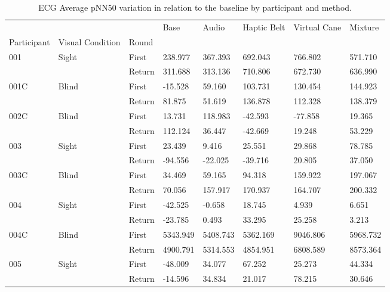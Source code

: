 
\begin{table}[!htb]
\centering
\caption{ECG Average pNN50 variation in relation to the baseline by participant and method.}
\label{tab:ecg_pnn50_variation}
\begin{tabular}{llllllll}
\toprule
    &       &        &     Base &    Audio & Haptic Belt & Virtual Cane &  Mixture \\
Participant & Visual Condition & Round &          &          &             &              &          \\
\midrule
001 & Sight & First &  238.977 &  367.393 &     692.043 &      766.802 &  571.710 \\
    &       & Return &  311.688 &  313.136 &     710.806 &      672.730 &  636.990 \\
001C & Blind & First &  -15.528 &   59.160 &     103.731 &      130.454 &  144.923 \\
    &       & Return &   81.875 &   51.619 &     136.878 &      112.328 &  138.379 \\
002C & Blind & First &   13.731 &  118.983 &     -42.593 &      -77.858 &   19.365 \\
    &       & Return &  112.124 &   36.447 &     -42.669 &       19.248 &   53.229 \\
003 & Sight & First &   23.439 &    9.416 &      25.551 &       29.868 &   78.785 \\
    &       & Return &  -94.556 &  -22.025 &     -39.716 &       20.805 &   37.050 \\
003C & Blind & First &   34.469 &   59.165 &      94.318 &      159.922 &  197.067 \\
    &       & Return &   70.056 &  157.917 &     170.937 &      164.707 &  200.332 \\
004 & Sight & First &  -42.525 &   -0.658 &      18.745 &        4.939 &    6.651 \\
    &       & Return &  -23.785 &    0.493 &      33.295 &       25.258 &    3.213 \\
004C & Blind & First & 5343.949 & 5408.743 &    5362.169 &     9046.806 & 5968.732 \\
    &       & Return & 4900.791 & 5314.553 &    4854.951 &     6808.589 & 8573.364 \\
005 & Sight & First &  -48.009 &   34.077 &      67.252 &       25.273 &   44.334 \\
    &       & Return &  -14.596 &   34.834 &      21.017 &       78.215 &   30.646 \\
\bottomrule
\end{tabular}
\end{table}

